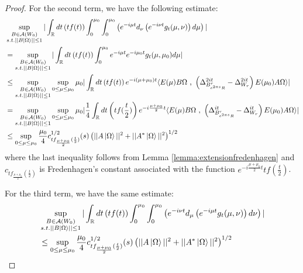 \documentclass[a4paper,11pt]{article}
\theoremstyle{definition}
\newcommand{\lb}{\left(}
\newcommand{\rb}{\right)}
\begin{document}
\begin{proof}
    For the second term, we have the following estimate:
    \begin{align}
        \begin{split}
            &\sup_{\substack{B\in\mathcal{A}(W_0)\\s.t.||B\ket{\Omega}||\leq 1}}|\int_\mathbb{R} dt \lb tf(t) \rb\int_0^{\mu_0}\int_0^{\mu_0}\lb e^{-i\mu t}d_\nu\lb e^{-i\nu t}g_t(\mu,\nu) \rb d\mu \rb|
            \\&
            =\sup_{\substack{B\in\mathcal{A}(W_0)\\s.t.||B\ket{\Omega}||\leq 1}}|\int_\mathbb{R}dt \lb tf(t)\rb\int_0^{\mu_0}e^{-i\mu t} e^{-i\mu_0 t}g_t(\mu,\mu_0) d\mu|
            \\&
            \leq \sup_{\substack{B\in\mathcal{A}(W_0)\\s.t.||B\ket{\Omega}||\leq 1}}\sup_{0\leq\mu\leq\mu_0}\mu_0|\int_\mathbb{R} dt\lb tf(t) \rb e^{-i(\mu + \mu_0) t}\langle E(\mu)B\Omega\text{ , }\lb\Delta^{2it}_{B^r_{e^{2\pi s}R}} - \Delta^{2it}_{W_r}\rb E(\mu_0)A\Omega \rangle|
            \\&
            =\sup_{\substack{B\in\mathcal{A}(W_0)\\s.t.||B\ket{\Omega}||\leq 1}}\sup_{0\leq \mu\leq\mu_0}\mu_0|\frac{1}{4}\int_\mathbb{R} dt \lb tf(\frac{t}{2}) \rb e^{-i\frac{\mu + \mu_0}{2}t}\langle E(\mu)B\Omega\text{ , }\lb\Delta^{it}_{B^r_{e^{2\pi s}R}} - \Delta^{it}_{W_r}\rb E(\mu_0)A\Omega \rangle|
            \\&
            \leq \sup_{0\leq \mu\leq\mu_0}\frac{\mu_0}{4} c^{1/2}_{tf_{\frac{\mu + \mu_0}{2}}(\frac{t}{2})}(s)\lb||A\ket{\Omega}||^2 + ||A^*\ket{\Omega}||^2\rb^{1/2}
        \end{split}
    \end{align}
    where the last inequality follows from Lemma \ref{lemma:extensionfredenhagen} and $c_{tf_{\frac{\mu + \mu_0}{2}}(\frac{t}{2})}$ is Fredenhagen's constant associated with the function $e^{-i\frac{\mu + \mu_0}{2}t}tf(\frac{t}{2})$.

    For the third term, we have the same estimate:
    \begin{align}
        \begin{split}
            &\sup_{\substack{B\in\mathcal{A}(W_0)\\s.t.||B\ket{\Omega}||\leq 1}}|\int_\mathbb{R} dt \lb tf(t) \rb\int_0^{\mu_0}\int_0^{\mu_0}\lb e^{-i\nu t}d_\mu\lb e^{-i\mu t}g_t(\mu,\nu) \rb d\nu \rb|\\&
            \leq\sup_{0\leq \mu\leq\mu_0}\frac{\mu_0}{4}c^{1/2}_{tf_{\frac{\mu + \mu_0}{2}}(\frac{t}{2})}(s)\lb||A\ket{\Omega}||^2 + ||A^*\ket{\Omega}||^2\rb^{1/2}
        \end{split}
    \end{align}


\end{proof}
\end{document}
